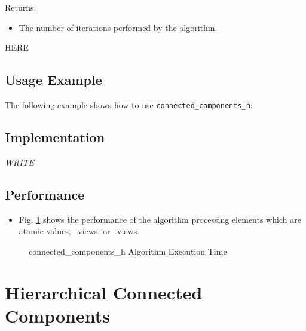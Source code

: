 Returns:
\begin{itemize}
\item
The number of iterations performed by the algorithm. 
\end{itemize}

HERE
\subsection{Usage Example} \label{sec-conn-comp-hmach-alg-use}

The following example shows how to use 
\texttt{connected\_components\_h}:


\subsection{Implementation} \label{sec-conn-comp-hmach-alg-impl}

\textit{WRITE}

\subsection{Performance} \label{sec-conn-compmach-h-alg-perf}

\begin{itemize}
\item
Fig. \ref{fig:conn-comp-hmach-alg-exec-exper}
shows the performance of the algorithm processing
elements which are atomic values, \stl\ views, or \stapl\ views.
\end{itemize}

\begin{figure}[p]
\caption{connected\_components\_h Algorithm Execution Time}
\label{fig:conn-comp-hmach-alg-exec-exper}
\end{figure}



\section{ Hierarchical Connected Components}
\label{sec-conn-comp-hmach-hubs-alg}

